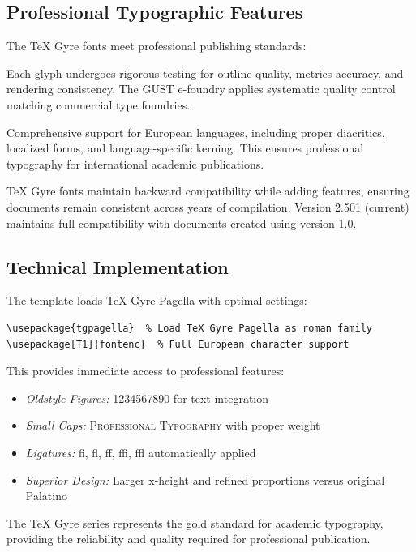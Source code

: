 \documentclass[11pt]{article}
\begin{document}
\subsection{Professional Typographic Features}

The TeX Gyre fonts meet professional publishing standards:

 Each glyph undergoes rigorous testing for outline quality, metrics accuracy, and rendering consistency. The GUST e-foundry applies systematic quality control matching commercial type foundries.

 Comprehensive support for European languages, including proper diacritics, localized forms, and language-specific kerning. This ensures professional typography for international academic publications.

 TeX Gyre fonts maintain backward compatibility while adding features, ensuring documents remain consistent across years of compilation. Version 2.501 (current) maintains full compatibility with documents created using version 1.0.

\subsection{Technical Implementation}

The template loads TeX Gyre Pagella with optimal settings:

\begin{verbatim}
\usepackage{tgpagella}  % Load TeX Gyre Pagella as roman family
\usepackage[T1]{fontenc}  % Full European character support
\end{verbatim}

This provides immediate access to professional features:
\begin{itemize}
\item \emph{Oldstyle Figures:} 1234567890 for text integration
\item \emph{Small Caps:} \textsc{Professional Typography} with proper weight
\item \emph{Ligatures:} fi, fl, ff, ffi, ffl automatically applied
\item \emph{Superior Design:} Larger x-height and refined proportions versus original Palatino
\end{itemize}

The TeX Gyre series represents the gold standard for academic typography, providing the reliability and quality required for professional publication.
\end{document}
